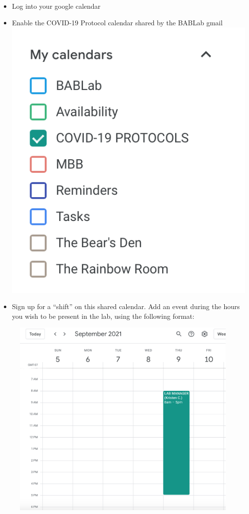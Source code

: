 \documentclass[
]{book}
\begin{document}
\begin{itemize}
\item
  Log into your google calendar
\item
  Enable the COVID-19 Protocol calendar shared by the BABLab gmail
  \includegraphics{images/lab_protocols/covid_protocols/1.png}
\item
  Sign up for a ``shift'' on this shared calendar. Add an event during the hours you wish to be present in the lab, using the following format:
\end{itemize}

\begin{figure}
\centering
\includegraphics{images/lab_protocols/covid_protocols/2.png}
\caption{}
\end{figure}
\end{document}
